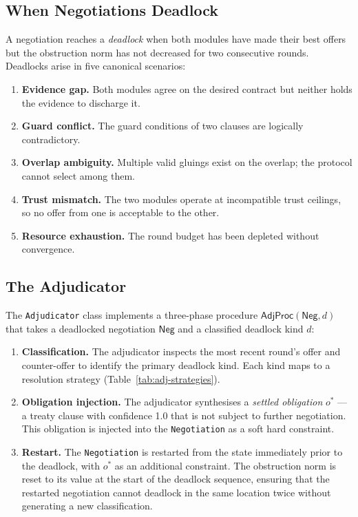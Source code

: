 \documentclass[11pt]{article}
\newcommand{\Neg}{\mathsf{Neg}}           %
\newcommand{\AdjProc}{\mathsf{AdjProc}}   %
\begin{document}
\subsection{When Negotiations Deadlock}

A negotiation reaches a \emph{deadlock} when both modules have made
their best offers but the obstruction norm has not decreased for two
consecutive rounds.  Deadlocks arise in five canonical scenarios:

\begin{enumerate}[leftmargin=*,noitemsep,label=(\roman*)]
  \item \textbf{Evidence gap.} Both modules agree on the desired
    contract but neither holds the evidence to discharge it.
  \item \textbf{Guard conflict.} The guard conditions of two clauses
    are logically contradictory.
  \item \textbf{Overlap ambiguity.} Multiple valid gluings exist on
    the overlap; the protocol cannot select among them.
  \item \textbf{Trust mismatch.} The two modules operate at
    incompatible trust ceilings, so no offer from one is acceptable
    to the other.
  \item \textbf{Resource exhaustion.} The round budget has been
    depleted without convergence.
\end{enumerate}

\subsection{The Adjudicator}

The \texttt{Adjudicator} class implements a three-phase procedure
$\AdjProc(\Neg, d)$ that takes a deadlocked negotiation $\Neg$ and a
classified deadlock kind $d$:

\begin{enumerate}[leftmargin=*,noitemsep]
  \item \textbf{Classification.} The adjudicator inspects the
    most recent round's offer and counter-offer to identify the
    primary deadlock kind.  Each kind maps to a resolution strategy
    (Table~\ref{tab:adj-strategies}).

  \item \textbf{Obligation injection.} The adjudicator synthesises
    a \emph{settled obligation} $o^*$ — a treaty clause with
    confidence 1.0 that is not subject to further negotiation.
    This obligation is injected into the \texttt{Negotiation} as a
    soft hard constraint.

  \item \textbf{Restart.} The \texttt{Negotiation} is restarted
    from the state immediately prior to the deadlock, with $o^*$
    as an additional constraint.  The obstruction norm is reset
    to its value at the start of the deadlock sequence, ensuring
    that the restarted negotiation cannot deadlock in the same
    location twice without generating a new classification.
\end{enumerate}
\end{document}
